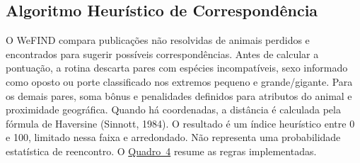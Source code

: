 \subsection{Algoritmo Heurístico de Correspondência}

O WeFIND compara publicações não resolvidas de animais perdidos e encontrados para sugerir possíveis correspondências. Antes de calcular a pontuação, a rotina descarta pares com espécies incompatíveis, sexo informado como oposto ou porte classificado nos extremos pequeno e grande/gigante. Para os demais pares, soma bônus e penalidades definidos para atributos do animal e proximidade geográfica. Quando há coordenadas, a distância é calculada pela fórmula de Haversine (Sinnott, 1984). O resultado é um índice heurístico entre 0 e 100, limitado nessa faixa e arredondado. Não representa uma probabilidade estatística de reencontro. O \hyperlink{quadro:matching}{Quadro~4} resume as regras implementadas.

